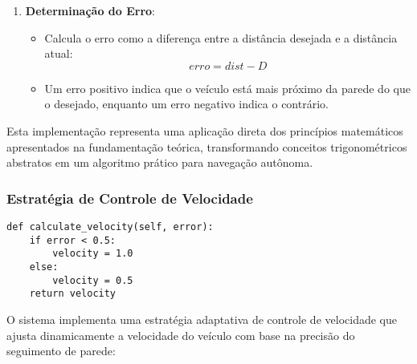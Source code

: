 \begin{enumerate}
    \item \textbf{Determinação do Erro}:
          \begin{itemize}
              \item Calcula o erro como a diferença entre a distância desejada e a distância atual:
                    \begin{equation}
                        erro = dist - D
                    \end{equation}
              \item Um erro positivo indica que o veículo está mais próximo da parede do que o
                    desejado, enquanto um erro negativo indica o contrário.
          \end{itemize}
\end{enumerate}

Esta implementação representa uma aplicação direta dos princípios matemáticos
apresentados na fundamentação teórica, transformando conceitos trigonométricos
abstratos em um algoritmo prático para navegação autônoma.

\subsubsection{Estratégia de Controle de Velocidade}

\begin{verbatim}
def calculate_velocity(self, error):
    if error < 0.5:
        velocity = 1.0 
    else:
        velocity = 0.5
    return velocity
\end{verbatim}

O sistema implementa uma estratégia adaptativa de controle de velocidade que
ajusta dinamicamente a velocidade do veículo com base na precisão do seguimento
de parede:

